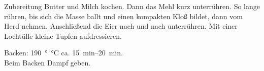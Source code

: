\begin{recipestep}
  {Zubereitung}
  Butter und Milch kochen. Dann das Mehl kurz unterrühren. So lange rühren, bis sich
  die Masse ballt und einen kompakten Kloß bildet, dann vom Herd nehmen. Anschließend
  die Eier nach und nach unterrühren. Mit einer Lochtülle kleine Tupfen aufdressieren.

  Backen: \SI{190}{\degree\celsius} ca. \SIrange{15}{20}{\minute}.\\
  Beim Backen Dampf geben.
\end{recipestep}
